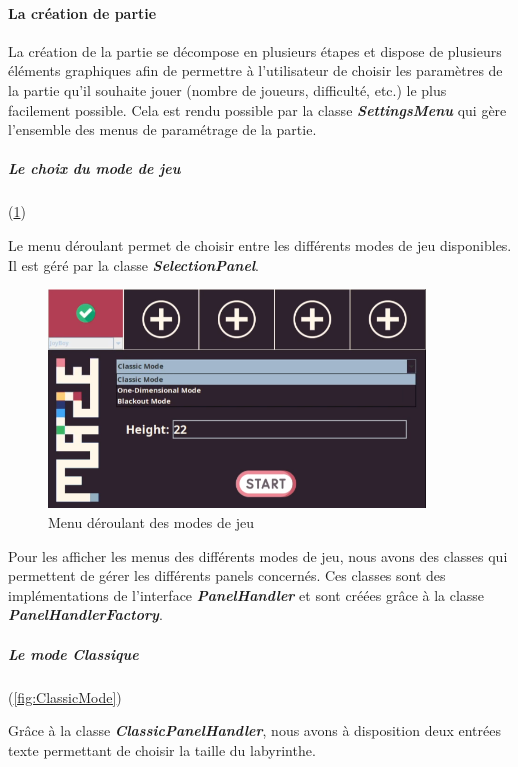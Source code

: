 \paragraph{La création de partie}

La création de la partie se décompose en plusieurs étapes et dispose de plusieurs éléments graphiques afin de permettre à l'utilisateur de choisir les paramètres de la partie qu'il souhaite jouer (nombre de joueurs, difficulté, etc.) le plus facilement possible. Cela est rendu possible par la classe \textbf{\textit{SettingsMenu}} qui gère l'ensemble des menus de paramétrage de la partie.

\subparagraph*{Le choix du mode de jeu} (\ref{fig:ModeSelection})

Le menu déroulant permet de choisir entre les différents modes de jeu disponibles. Il est géré par la classe \textbf{\textit{SelectionPanel}}.

\begin{figure}[h!]
    \centering
    \includegraphics[width=10cm]{ressources/Implementation/Labyrinthe/Controleur/SettingsMenu_ModeList.png}%
    \caption{Menu déroulant des modes de jeu}
    \label{fig:ModeSelection}
\end{figure}
\FloatBarrier

Pour les afficher les menus des différents modes de jeu, nous avons des classes qui permettent de gérer les différents panels concernés. Ces classes sont des implémentations de l'interface  \textbf{\textit{PanelHandler}} et sont créées grâce à la classe  \textbf{\textit{PanelHandlerFactory}}.

\subparagraph*{Le mode Classique} (\ref{fig:ClassicMode})

Grâce à la classe \textbf{\textit{ClassicPanelHandler}}, nous avons à disposition deux entrées texte permettant de choisir la taille du labyrinthe.

